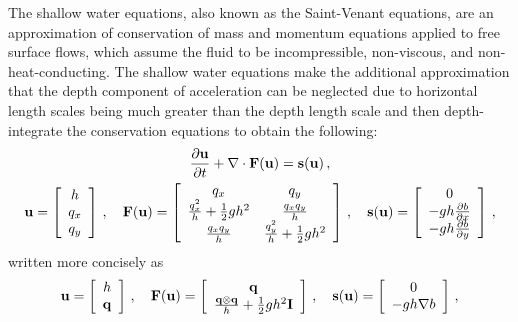 The shallow water equations, also known as the Saint-Venant equations, are an
approximation of conservation of mass and momentum equations applied to free
surface flows, which assume the fluid to be incompressible, non-viscous, and
non-heat-conducting. The shallow water equations make the additional
approximation that the depth component of acceleration can be neglected due to
horizontal length scales being much greater than the depth length
scale and then depth-integrate the conservation equations to obtain
the following\cite{toro2009}\cite{leveque2002}:
\begin{equation}
\begin{gathered}
  \ppt{\vectorsolution} + \nabla\cdot\consfluxvector
  = \conssource \eqc
\\
  \vectorsolution
    = \left[\begin{array}{c}
        \height\\
        \heightmomentumx\\
        \heightmomentumy
      \end{array}\right]
  \eqc\quad
  \consfluxvector
  = \left[\begin{array}{c c}
      \heightmomentumx & \heightmomentumy\\
      \frac{\heightmomentumx^2}{\height} + \half\gravity\height^2
        & \frac{\heightmomentumx\heightmomentumy}{\height}\\
      \frac{\heightmomentumx\heightmomentumy}{\height}
        & \frac{\heightmomentumy^2}{\height} + \half\gravity\height^2\\
    \end{array}\right]
  \eqc\quad
  \conssource
  = \left[\begin{array}{c}
      0\\
     -\gravity\height\pd{\bathymetry}{x}\\
     -\gravity\height\pd{\bathymetry}{y}\\
    \end{array}\right]
  \eqc
\end{gathered}
\end{equation}
written more concisely as
\[
  \vectorsolution
    = \left[\begin{array}{c}\height\\\heightmomentum\end{array}\right]
  \eqc\quad
  \consfluxvector
  = \left[\begin{array}{c}\heightmomentum\\
      \frac{\heightmomentum\otimes\heightmomentum}{\height}
      + \half\gravity\height^2\identity
    \end{array}\right]
  \eqc\quad
  \conssource
  = \left[\begin{array}{c}0\\-\gravity\height\nabla\bathymetry\end{array}
    \right] \eqc
\]
